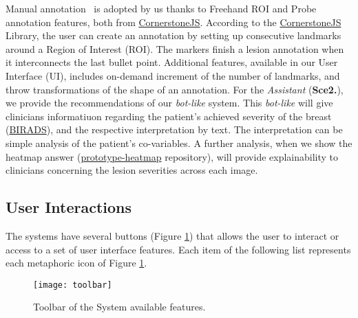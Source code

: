 Manual annotation~ is adopted by us thanks to Freehand ROI and Probe annotation features, both from \hyperlink{https://cornerstonejs.org/}{CornerstoneJS}. According to the \hyperlink{https://cornerstonejs.org/}{CornerstoneJS} Library, the user can create an annotation by setting up consecutive landmarks around a Region of Interest (ROI). The markers finish a lesion annotation when it interconnects the last bullet point. Additional features, available in our User Interface (UI), includes on-demand increment of the number of landmarks, and throw transformations of the shape of an annotation. For the \textit{Assistant} (\textbf{Sce2.}), we provide the recommendations of our \textit{bot-like} system. This \textit{bot-like} will give clinicians informatiuon regarding the patient's achieved severity of the breast (\hyperlink{https://en.wikipedia.org/wiki/BI-RADS}{BIRADS}), and the respective interpretation by text. The interpretation can be simple analysis of the patient's co-variables. A further analysis, when we show the heatmap answer (\hyperlink{https://github.com/mida-project/prototype-heatmap}{prototype-heatmap} repository), will provide explainability to clinicians concerning the lesion severities across each image.

\clearpage


\subsection{User Interactions}

The systems have several buttons (Figure \ref{fig:toolbar}) that allows the user to interact or access to a set of user interface features. Each item of the following list represents each metaphoric icon of Figure \ref{fig:toolbar}.


\hfill

\begin{figure}[h]
\centering
\texttt{[image: toolbar]}
\caption{Toolbar of the System available features.}
\label{fig:toolbar}
\end{figure}

\hfill

